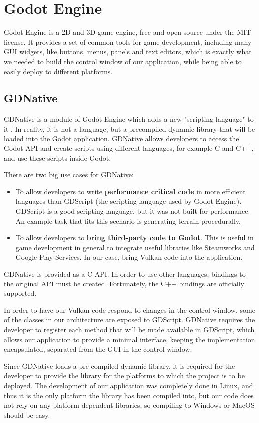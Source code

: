 \section{Godot Engine}
Godot Engine is a 2D and 3D game engine, free and open source under the MIT license. It provides a set of common tools for game development, including many GUI widgets, like buttons, menus, panels and text editors, which is exactly what we needed to build the control window of our application, while being able to easily deploy to different platforms.

\subsection{GDNative}
GDNative is a module of Godot Engine which adds a new "scripting language" to it \cite{gdnative_post}. In reality, it is not a language, but a precompiled dynamic library that will be loaded into the Godot application. GDNative allows developers to access the Godot API and create scripts using different languages, for example C and C++,  and use these scripts inside Godot.

There are two big use cases for GDNative:

\begin{itemize}
    \item To allow developers to write \textbf{performance critical code} in more efficient languages than GDScript (the scripting language used by Godot Engine). GDScript is a good scripting language, but it was not built for performance. An example task that fits this scenario is generating terrain procedurally.
    \item To allow developers to \textbf{bring third-party code to Godot}. This is useful in game development in general to integrate useful libraries like Steamworks and Google Play Services. In our case, bring Vulkan code into the application.
\end{itemize}

GDNative is provided as a C API. In order to use other languages, bindings to the original API must be created. Fortunately, the C++ bindings are officially supported.

In order to have our Vulkan code respond to changes in the control window, some of the classes in our architecture are exposed to GDScript. GDNative requires the developer to register each method that will be made available in GDScript, which allows our application to provide a minimal interface, keeping the implementation encapsulated, separated from the GUI in the control window.

Since GDNative loads a pre-compiled dynamic library, it is required for the developer to provide the library for the platforms to which the project is to be deployed. The development of our application was completely done in Linux, and thus it is the only platform the library has been compiled into, but our code does not rely on any platform-dependent libraries, so compiling to Windows or MacOS should be easy.
